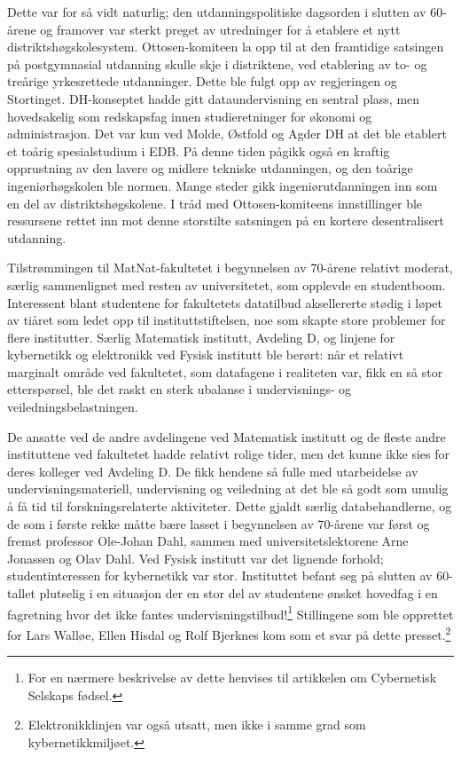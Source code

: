 Dette var for så vidt naturlig; den utdanningspolitiske dagsorden i slutten av 60-årene og framover var sterkt preget av utredninger for å etablere et nytt distriktshøgskolesystem. Ottosen-komiteen la opp til at den framtidige satsingen på postgymnasial utdanning skulle skje i distriktene, ved etablering av to- og treårige yrkesrettede utdanninger. Dette ble fulgt opp av regjeringen og Stortinget. DH-konseptet hadde gitt dataundervisning en sentral plass, men hovedsakelig som redskapsfag innen studieretninger for økonomi og administrasjon. Det var kun ved Molde, Østfold og Agder DH at det ble etablert et toårig spesialstudium i EDB. På denne tiden pågikk også en kraftig opprustning av den lavere og midlere tekniske utdanningen, og den toårige ingeniørhøgskolen ble normen. Mange steder gikk ingeniørutdanningen inn som en del av distriktshøgskolene. I tråd med Ottosen-komiteens innstillinger ble ressursene rettet inn mot denne storstilte satsningen på en kortere desentralisert utdanning.

Tilstrømmingen til MatNat-fakultetet i begynnelsen av 70-årene relativt moderat, særlig sammenlignet med resten av universitetet, som opplevde en studentboom. Interessent blant studentene for fakultetets datatilbud aksellererte stødig i løpet av tiåret som ledet opp til instituttstiftelsen, noe som skapte store problemer for flere institutter. Særlig Matematisk institutt, Avdeling D, og linjene for kybernetikk og elektronikk ved Fysisk institutt ble berørt: når et relativt marginalt område ved fakultetet, som datafagene i realiteten var, fikk en så stor etterspørsel, ble det raskt en sterk ubalanse i undervisnings- og veiledningsbelastningen. 

De ansatte ved de andre avdelingene ved Matematisk institutt og de fleste andre instituttene ved fakultetet hadde relativt rolige tider, men det kunne ikke sies for deres kolleger ved Avdeling D. De fikk hendene så fulle med utarbeidelse av undervisningsmateriell, undervisning og veiledning at det ble så godt som umulig å få tid til forskningsrelaterte aktiviteter. Dette gjaldt særlig databehandlerne, og de som i første rekke måtte bære lasset i begynnelsen av 70-årene var først og fremst professor Ole-Johan Dahl, sammen med universitetslektorene Arne Jonassen og Olav Dahl. Ved Fysisk institutt var det lignende forhold; studentinteressen for kybernetikk var stor. Instituttet befant seg på slutten av 60-tallet plutselig i en situasjon der en stor del av studentene ønsket hovedfag i en fagretning hvor det ikke fantes undervisningstilbud!\footnote{For en nærmere beskrivelse av dette henvises til artikkelen om Cybernetisk Selskaps fødsel.} Stillingene som ble opprettet for Lars Walløe, Ellen Hisdal og Rolf Bjerknes kom som et svar på dette presset.\footnote{Elektronikklinjen  var  også  utsatt,  men  ikke  i  samme  grad  som  kybernetikkmiljøet.} 

